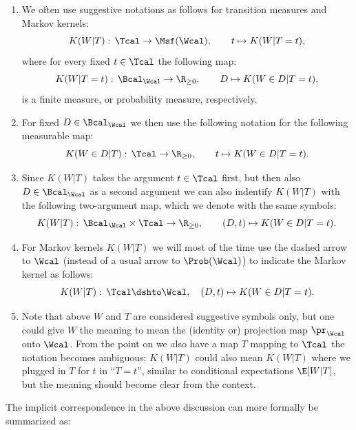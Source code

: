 \begin{Not}
    \begin{enumerate}
        \item We often use suggestive notations as follows for transition measures and Markov kernels:
            \[ K(W|T):\, \Tcal \to \Msf(\Wcal),\qquad t \mapsto K(W|T=t),  \]
            where for every fixed $t \in \Tcal$ the following map: 
            \[ K(W|T=t):\, \Bcal_\Wcal \to \R_{\ge0}, \qquad D \mapsto K(W \in D|T=t),\]
            is a finite measure, or probability measure, respectively.
        \item For fixed $D \in \Bcal_\Wcal$ we then use the following notation for the following measurable map:
            \[ K(W \in D|T):\, \Tcal \to \R_{\ge0} ,\qquad t \mapsto K(W \in D|T=t).  \]
        \item Since $K(W|T)$ takes the argument $t \in \Tcal$ first, but then also $D \in \Bcal_\Wcal$ as a second argument 
            we can also indentify $K(W|T)$ with 
            the following two-argument map, which we denote with the same symbols:
            \[ K(W|T):\, \Bcal_\Wcal \times \Tcal \to \R_{\ge 0}, \qquad (D,t) \mapsto K(W \in D|T=t).  \]
        \item For Markov kernels $K(W|T)$ we will most of the time use the dashed arrow to $\Wcal$ (instead of a usual arrow to $\Prob(\Wcal)$) to indicate the Markov kernel as follows:
    \[ K(W|T):\, \Tcal \dshto \Wcal,\quad (D,t) \mapsto K(W \in D|T=t).  \]
\item Note that above $W$ and $T$ are considered suggestive symbols only, but one could give $W$ the meaning to mean the (identity or) projection map 
    $\pr_\Wcal$ onto $\Wcal$. 
    From the point on we also have a map $T$ mapping to $\Tcal$ the notation becomes ambiguous: $K(W|T)$ could also mean $K(W|T)$ where we plugged in $T$ for $t$ in ``$T=t$'',
     similar to conditional expectations $\E[W|T]$, but the meaning should become clear from the context.
     \end{enumerate}
\end{Not}

The implicit correspondence in the above discussion can more formally be summarized as:

